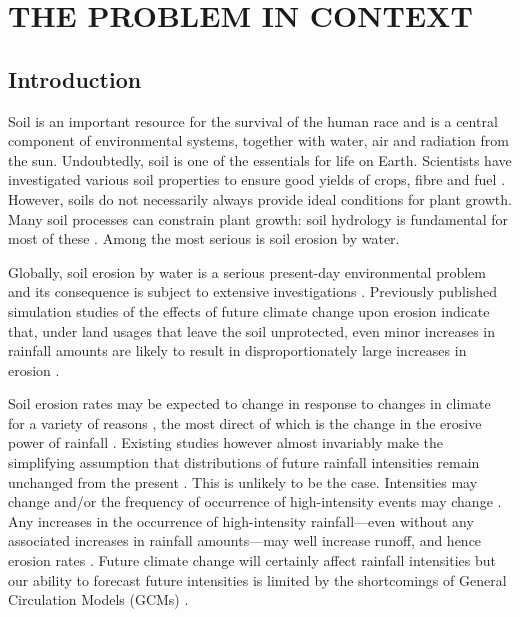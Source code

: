 \chapter{THE PROBLEM IN CONTEXT}
\label{sec:PROBLEMINTHECONTEXT}

\section{Introduction}
\label{sec:Rationale}
Soil is an important resource for the survival of the human race and is a
central component of environmental systems, together with water, air and
radiation from the sun. Undoubtedly, soil is one of the essentials for life on
Earth. Scientists have investigated various soil properties to ensure good
yields of crops, fibre and fuel \citep{cresser1993-192}. However, soils do not
necessarily always provide ideal conditions for plant growth. Many soil
processes can constrain plant growth: soil hydrology is fundamental for most of
these \citep{hudson1971-320, evans1980-mechanics, kirkby1980-1,
morgan1995-soil}. Among the most serious is soil erosion by water.

Globally, soil erosion by water is a serious present-day environmental problem
and its consequence is subject to extensive investigations
\citep{kirkby1980-1,morgan1995-soil}. Previously published simulation studies of
the effects of future climate change upon erosion indicate that, under land
usages that leave the soil unprotected, even minor increases in rainfall amounts
are likely to result in disproportionately large increases in erosion
\citep{kirkby1980-1, favis-mortlock1995-365}.

Soil erosion rates may be expected to change in response to changes in climate
for a variety of reasons \citep{pruski2002-climate}, the most direct of which is
the change in the erosive power of rainfall
\citep{favis-mortlock1996-529,williams1996-381,favis-mortlock1999-329,
nearing2001-229,pruski2002-climate}.
Existing studies however almost invariably make the simplifying assumption that
distributions of future rainfall intensities remain unchanged from the present
\citep{favis-mortlock1995-265,favis-mortlock1995-365,favis-mortlock1999-329,
pruski2002-climate,pruski2002-7,o'neal2005-165}. This is unlikely to be the
case. Intensities may change and/or the frequency of occurrence of
high-intensity events may change \citep{karl1995-217,houghton1996-climate,
watson1998-517,karl1998-231,osborn1998-505,osborn2002-1313}. Any
increases in the occurrence of high-intensity rainfall---even without any
associated increases in rainfall amounts---may well increase runoff, and hence
erosion rates \citep{kirkby1980-1, morgan1995-soil, parsons2000-723}. Future
climate change will certainly affect rainfall intensities but our ability to
forecast future intensities is limited by the shortcomings of General
Circulation Models (GCMs) \citep{favis-mortlock1995-365}.

